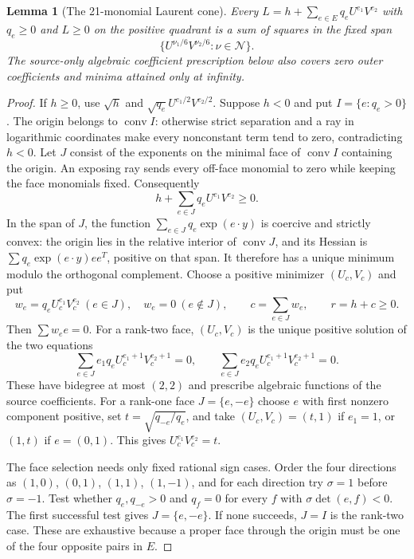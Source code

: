 \documentclass[11pt]{article}
\newtheorem{lemma}{Lemma}
\begin{document}
\begin{lemma}[The 21-monomial Laurent cone]
Every $L=h+\sum_{e\in E}q_e U^{e_1}V^{e_2}$ with $q_e\geq0$ and
$L\geq0$ on the positive quadrant is a sum of squares in the fixed span
\[
             \{U^{\nu_1/6}V^{\nu_2/6}:\nu\in\mathcal N\}.
                                                               \tag{11}
\]
The source-only algebraic coefficient prescription below also covers
zero outer coefficients and minima attained only at infinity.
\end{lemma}

\begin{proof}
If $h\geq0$, use $\sqrt h$ and $\sqrt{q_e}U^{e_1/2}V^{e_2/2}$.
Suppose $h<0$ and put $I=\{e:q_e>0\}$.  The origin belongs to
$\operatorname{conv}I$: otherwise strict separation and a ray in logarithmic
coordinates make every nonconstant term tend to zero, contradicting
$h<0$.  Let $J$ consist of the exponents on the minimal face of
$\operatorname{conv}I$ containing the origin.  An exposing ray sends
every off-face monomial to zero while keeping the face monomials fixed.
Consequently
\[
              h+\sum_{e\in J}q_eU^{e_1}V^{e_2}\geq0. \tag{12}
\]
In the span of $J$, the function
$\sum_{e\in J}q_e\exp(e\cdot y)$ is coercive and strictly convex:
the origin lies in the relative interior of $\operatorname{conv}J$, and
its Hessian is $\sum q_e\exp(e\cdot y)ee^T$, positive on that span.
It therefore has a unique minimum modulo the orthogonal complement.
Choose a positive minimizer $(U_c,V_c)$ and put
\[
 w_e=q_eU_c^{e_1}V_c^{e_2}\ (e\in J),\quad w_e=0\ (e\notin J),\qquad
 c=\sum_{e\in J}w_e,\qquad r=h+c\geq0.
\]
Then $\sum w_ee=0$.  For a rank-two face, $(U_c,V_c)$ is the unique
positive solution of the two equations
\[
 \sum_{e\in J} e_1q_e U_c^{e_1+1}V_c^{e_2+1}=0,
 \qquad
 \sum_{e\in J} e_2q_e U_c^{e_1+1}V_c^{e_2+1}=0.       \tag{13}
\]
These have bidegree at most $(2,2)$ and prescribe algebraic functions
of the source coefficients.  For a rank-one face $J=\{e,-e\}$ choose
$e$ with first nonzero component positive, set
$t=\sqrt{q_{-e}/q_e}$, and take $(U_c,V_c)=(t,1)$ if $e_1=1$,
or $(1,t)$ if $e=(0,1)$.  This gives $U_c^{e_1}V_c^{e_2}=t$.

The face selection needs only fixed rational sign cases.  Order the four
directions as $(1,0)$, $(0,1)$, $(1,1)$, $(1,-1)$, and for each direction
try $\sigma=1$ before $\sigma=-1$.  Test whether $q_e,q_{-e}>0$ and
$q_f=0$ for every $f$ with
$\sigma\det(e,f)<0$.  The first successful test gives
$J=\{e,-e\}$.  If none succeeds, $J=I$ is the rank-two case.
These are exhaustive because a proper face through the origin must
be one of the four opposite pairs in $E$.


\end{proof}
\end{document}

